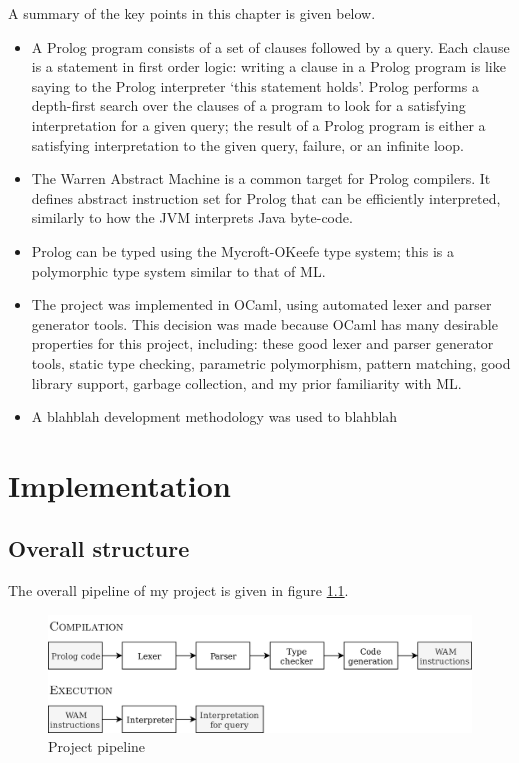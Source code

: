 \documentclass[12pt,a4paper]{report}
\begin{document}
A summary of the key points in this chapter is given below.
\begin{itemize}
\item A Prolog program consists of a set of clauses followed by a query. Each clause is a statement in first order logic: writing a clause in a Prolog program is like saying to the Prolog interpreter `this statement holds'. Prolog performs a depth-first search over the clauses of a program to look for a satisfying interpretation for a given query; the result of a Prolog program is either a satisfying interpretation to the given query, failure, or an infinite loop.

\item  The Warren Abstract Machine is a common target for Prolog compilers. It defines abstract instruction set for Prolog that can be efficiently interpreted, similarly to how the JVM interprets Java byte-code.

\item Prolog can be typed using the Mycroft-OKeefe type system; this is a polymorphic type system similar to that of ML.

\item The project was implemented in OCaml, using automated lexer and parser generator tools. This decision
was made because OCaml has many desirable properties for this project, including: these good lexer and parser generator tools, static type checking, parametric polymorphism, pattern matching, good library support, garbage collection, and my prior familiarity with ML. 

\item A blahblah development methodology was used to blahblah
\end{itemize}

\chapter{Implementation}

\section{Overall structure}

The overall pipeline of my project is given in figure \ref{pipeline}.

\begin{figure}
\begin{center}
\includegraphics[width=0.9\linewidth]{diagrams/Pipeline.png}
\end{center}
\caption{Project pipeline}
\label{pipeline}
\end{figure}
\end{document}
